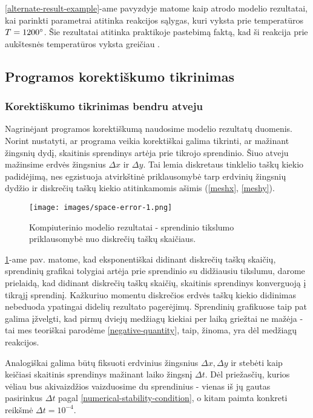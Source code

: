 \ref{alternate-result-example}-ame pavyzdyje matome kaip atrodo modelio rezultatai, kai parinkti parametrai atitinka reakcijos sąlygas, kuri vyksta prie temperatūros $T=1200\degree$. Šie rezultatai atitinka praktikoje pastebimą faktą, kad ši reakcija prie aukštesnės temperatūros vyksta greičiau \cite{ivanauskasComputationalModellingYAG2009}. 

\subsection{Programos korektiškumo tikrinimas}

\subsubsection*{Korektiškumo tikrinimas bendru atveju}

Nagrinėjant programos korektiškumą naudosime modelio rezultatų duomenis. 
Norint nustatyti, ar programa veikia korektiškai galima tikrinti, ar mažinant žingsnių dydį, skaitinis sprendinys artėja prie tikrojo sprendinio. Šiuo atveju mažinsime erdvės žingsnius $\Delta x$ ir $\Delta y$. Tai lemia diskretaus tinklelio taškų kiekio padidėjimą, nes egzistuoja atvirkštinė priklausomybė tarp erdvinių žingsnių dydžio ir diskrečių taškų kiekio atitinkamomis ašimis (\ref{meshx}, \ref{meshy}).

\newpage

\begin{figure}[h!]
    \centering
    \texttt{[image: images/space-error-1.png]}

    \caption{Kompiuterinio modelio rezultatai - sprendinio tikslumo priklausomybė nuo diskrečių taškų skaičiaus. }

    \label{results-space-error}
\end{figure}

\ref{results-space-error}-ame pav. matome, kad eksponentiškai didinant diskrečių taškų skaičių, sprendinių grafikai tolygiai artėja prie sprendinio su didžiausiu tikslumu, darome prielaidą, kad didinant diskrečių taškų skaičių, skaitinis sprendinys konverguoją į tikrąjį sprendinį. Kažkuriuo momentu diskrečios erdvės taškų kiekio didinimas nebeduoda ypatingai didelių rezultato pagerėjimų. Sprendinių grafikuose taip pat galima įžvelgti, kad pirmų dviejų medžiagų kiekiai per laiką griežtai ne mažėja - tai mes teoriškai parodėme \eqref{negative-quantity}, taip, žinoma, yra dėl  medžiagų reakcijos. 

Analogiškai galima būtų fiksuoti erdvinius žingsnius $\Delta x, \Delta y$ ir stebėti kaip keičiasi skaitinis sprendinys mažinant laiko žingsnį $\Delta t$. Dėl priežasčių, kurios vėliau bus akivaizdžios vaizduosime du sprendinius - vienas iš jų gautas pasirinkus $\Delta t$ pagal \eqref{numerical-stability-condition}, o kitam paimta konkreti reikšmė $\Delta t = 10^{-4}$.


